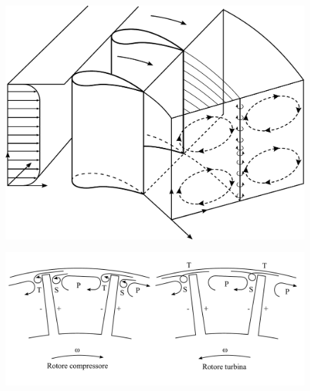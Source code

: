 \begin{figure}[h!]
\centering
  \includegraphics[width=.6\textwidth]{fig/VortVall.pdf}
\caption{}
\label{fd:VortVall}
\end{figure}
\begin{figure}[h!]
\centering
  \includegraphics[width=.8\textwidth]{fig/VortTraf.pdf}
\caption{}
\label{fd:VortTraf}
\end{figure}
